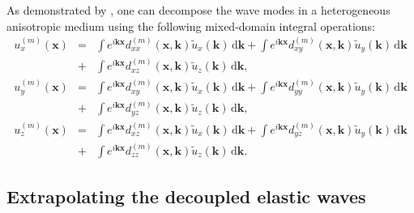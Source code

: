 As demonstrated by \cite{cheng.fomel:2014}, one can decompose the wave modes
in a heterogeneous anisotropic medium using the following mixed-domain integral operations:
\begin{equation}
\begin{array}{lcl}
\label{eq:decomXK3}
u_{x}^{(m)}(\mathbf{x})
&=&\int{e^{i\mathbf{k}\mathbf{x}}d_{xx}^{(m)}(\mathbf{x},\mathbf{k})\tilde{u}_{x}(\mathbf{k})}\,\mathrm{d}\mathbf{k}
+\int{e^{i\mathbf{k}\mathbf{x}}d_{xy}^{(m)}(\mathbf{x},\mathbf{k})\tilde{u}_{y}(\mathbf{k})}\,\mathrm{d}\mathbf{k}
\\
&+&\int{ e^{i\mathbf{k}\mathbf{x}}d_{xz}^{(m)}(\mathbf{x},\mathbf{k})
			  \tilde{u}_{z}(\mathbf{k})}\,\mathrm{d}\mathbf{k},\\
u_{y}^{(m)}(\mathbf{x})
&=&\int{e^{i\mathbf{k}\mathbf{x}}d_{xy}^{(m)}(\mathbf{x},\mathbf{k})\tilde{u}_{x}(\mathbf{k})}\,\mathrm{d}\mathbf{k}
+\int{e^{i\mathbf{k}\mathbf{x}}d_{yy}^{(m)}(\mathbf{x},\mathbf{k})\tilde{u}_{y}(\mathbf{k})}\,\mathrm{d}\mathbf{k}
\\
&+&\int{ e^{i\mathbf{k}\mathbf{x}}d_{yz}^{(m)}(\mathbf{x},\mathbf{k})
			  \tilde{u}_{z}(\mathbf{k})}\,\mathrm{d}\mathbf{k},\\
u_{z}^{(m)}(\mathbf{x})
&=&\int{e^{i\mathbf{k}\mathbf{x}}d_{xz}^{(m)}(\mathbf{x},\mathbf{k})\tilde{u}_{x}(\mathbf{k})}\,\mathrm{d}\mathbf{k}
+\int{e^{i\mathbf{k}\mathbf{x}}d_{yz}^{(m)}(\mathbf{x},\mathbf{k})\tilde{u}_{y}(\mathbf{k})}\,\mathrm{d}\mathbf{k}
\\
&+&\int{ e^{i\mathbf{k}\mathbf{x}}d_{zz}^{(m)}(\mathbf{x},\mathbf{k}) \tilde{u}_{z}(\mathbf{k})}\,\mathrm{d}\mathbf{k}.
\end{array}
\end{equation}

\subsection{Extrapolating the decoupled elastic waves}

